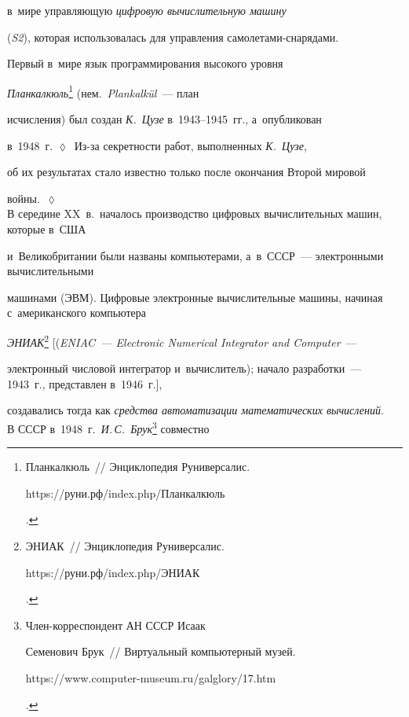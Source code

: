 в~мире управ\-ля\-ющую \textit{циф\-ро\-вую вы\-чис\-ли\-тель\-ную машину} 


(\textit{S2}), которая использовалась для управ\-ле\-ния са\-мо\-ле\-та\-ми-сна\-ря\-да\-ми. 


Пер\-вый в~мире язык программирования высокого уров\-ня 


\textit{Планкалкюль}\footnote[1]{Планкалкюль~/\!\!/ Энциклопедия Руниверсалис. {\sf 


https://руни.рф/index.php/Планкалкюль}.} (нем.\  \textit{Plankalk\"{u}l}~--- план 


ис\-чис\-ле\-ния) был создан \textit{К.~Цузе} в~1943--1945~гг., а~опуб\-ли\-ко\-ван 


в~1948~г. $\lozenge$~Из-за сек\-рет\-ности работ, выполненных \textit{К.~Цузе}, 


об их результатах стало известно только после окончания Второй мировой 


войны.~$\lozenge$\\[-14pt]


  


В середине XX~в.\ началось производство циф\-ро\-вых вы\-чис\-ли\-тель\-ных машин, которые в~США 


и~Великобритании были названы компьютерами, а~в~\mbox{СССР}~--- электронными вычислительными 


машинами (ЭВМ). Циф\-ро\-вые элект\-рон\-ные вы\-чис\-ли\-тель\-ные машины, начиная с~американского компьютера 


\textit{ЭНИАК}\footnote[2]{ЭНИАК~/\!\!/ Энциклопедия Руниверсалис. {\sf  


https://руни.рф/index.php/ЭНИАК}.} [(\textit{ENIAC~--- Electronic Numerical Integrator and Computer}~--- 


электронный чис\-ло\-вой интегратор и~вы\-чис\-ли\-тель); начало раз\-ра\-бот\-ки~--- 1943~г., пред\-став\-лен в~1946~г.], 


создавались тогда как \textit{средства автоматизации математических вы\-чис\-ле\-ний}.\\[-14pt] 





В СССР в~1948~г.\ \textit{И.\,С.~Брук}\footnote[3]{Член-корреспондент АН СССР Исаак 


Семенович Брук~/\!\!/ Виртуальный компьютерный музей. {\sf  


https://www.computer-museum.ru/galglory/17.htm}.} совместно 


